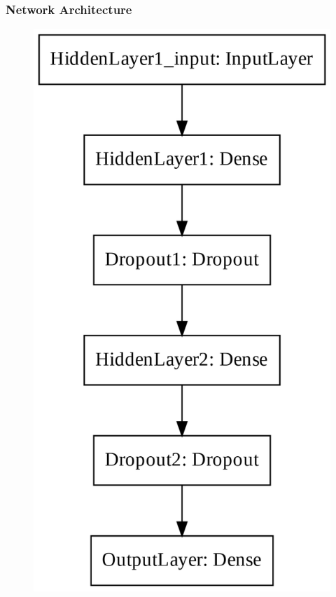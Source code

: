 \subsubsection{Network Architecture}
\label{ch5:ann_structure}

\begin{figure}[!htp]
\centering
\begin{minipage}[b][][b]{.35\linewidth}
    \includegraphics[width=\linewidth]{templates/images/Figure-TF_NN_Structure.png}

\end{minipage}
\end{figure}
